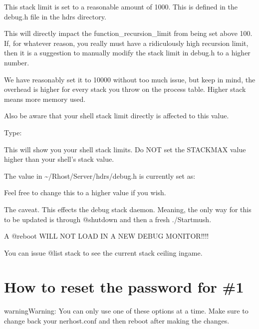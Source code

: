 \documentclass[letterpaper,10pt,english]{sphinxmanual}
\begin{document}
\sphinxAtStartPar
This stack limit is set to a reasonable amount of 1000.
This is defined in the debug.h file in the hdrs directory.

\sphinxAtStartPar
This will directly impact the function\_recursion\_limit from being
set above 100.  If, for whatever reason, you really must have
a ridiculously high recursion limit, then it is a suggestion to
manually modify the stack limit in debug.h to a higher number.

\sphinxAtStartPar
We have reasonably set it to 10000 without too much issue, but keep
in mind, the overhead is higher for every stack you throw on the
process table.  Higher stack means more memory used.

\sphinxAtStartPar
Also be aware that your shell stack limit directly is affected
to this value.

\sphinxAtStartPar
Type:

\begin{sphinxVerbatim}[commandchars=\\\{\}]
 
\end{sphinxVerbatim}

\sphinxAtStartPar
This will show you your shell stack limits.  Do NOT set the
STACKMAX value higher than your shell’s stack value.

\sphinxAtStartPar
The value in \textasciitilde{}/Rhost/Server/hdrs/debug.h is currently set as:

\begin{sphinxVerbatim}[commandchars=\\\{\}]
\end{sphinxVerbatim}

\sphinxAtStartPar
Feel free to change this to a higher value if you wish.

\sphinxAtStartPar
The caveat.  This effects the debug stack daemon.  Meaning,
the only way for this to be updated is through @shutdown and
then a fresh ./Startmush.

\sphinxAtStartPar
A @reboot WILL NOT LOAD IN A NEW DEBUG MONITOR!!!!

\sphinxAtStartPar
You can issue @list stack to see the current stack ceiling ingame.


\section{How to reset the password for \#1}
\label{\detokenize{troubleshooting:how-to-reset-the-password-for-1}}
\begin{sphinxadmonition}{warning}{Warning:}
\sphinxAtStartPar
You can only use one of these options at a time. Make sure to change back your nerhost.conf and then reboot after making the changes.
\end{sphinxadmonition}
\end{document}
